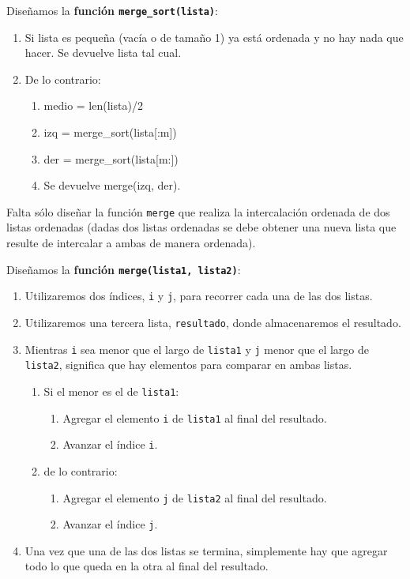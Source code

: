 Diseñamos la {\bf función \lstinline!merge_sort(lista)!}:

\begin{enumerate}
\item Si lista es pequeña (vacía o de tamaño 1) ya está ordenada y
no hay nada que hacer. Se devuelve lista tal cual.
\item De lo contrario:
\begin{enumerate}
\item medio = len(lista)/2
\item izq = merge\_sort(lista[:m])
\item der = merge\_sort(lista[m:])
\item Se devuelve merge(izq, der).
\end{enumerate}
\end{enumerate}

Falta sólo diseñar la función \lstinline!merge! que realiza la
intercalación ordenada de dos listas ordenadas (dadas dos listas ordenadas
se debe obtener una nueva lista que resulte de intercalar a ambas de manera
ordenada).

Diseñamos la {\bf función \lstinline!merge(lista1, lista2)!}:

\begin{enumerate}
\item Utilizaremos dos índices, \lstinline!i! y \lstinline!j!, para recorrer
cada una de las dos listas.
\item Utilizaremos una tercera lista, \lstinline!resultado!, donde
almacenaremos el resultado.

\item Mientras \lstinline!i! sea menor que el largo de \lstinline!lista1! y
\lstinline!j! menor que el largo de \lstinline!lista2!, significa que hay
elementos para comparar en ambas listas.

\begin{enumerate}
\item Si el menor es el de \lstinline!lista1!:
\begin{enumerate}
\item Agregar el elemento \lstinline!i! de \lstinline!lista1! al final del
resultado.
\item Avanzar el índice \lstinline!i!.
\end{enumerate}
\item de lo contrario:
\begin{enumerate}
\item Agregar el elemento \lstinline!j! de \lstinline!lista2! al final del
resultado.
\item Avanzar el índice \lstinline!j!.
\end{enumerate}

\end{enumerate}

\item Una vez que una de las dos listas se termina, simplemente hay que
agregar todo lo que queda en la otra al final del resultado.
\end{enumerate}

